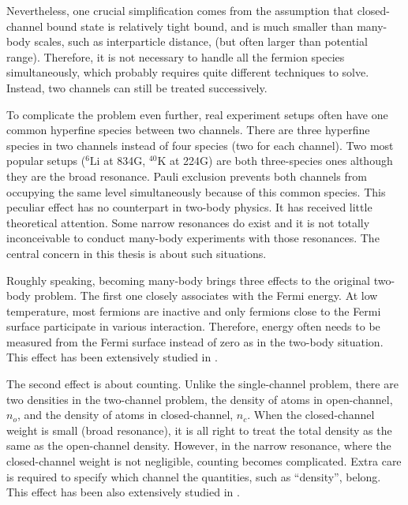   Nevertheless, one crucial simplification comes from  the assumption that closed-channel bound state is relatively tight bound, and is much smaller than  many-body scales, such as interparticle distance, (but often larger than potential range).  Therefore, it is not necessary to handle all the  fermion species simultaneously, which probably requires quite different techniques to solve. Instead, two channels can still be treated successively. 

To complicate the problem even further,  real experiment setups often have one common hyperfine species between two channels. There are three hyperfine species in two channels instead of four species (two for each channel).  Two most popular setups (${}^{6}\text{Li}$ at 834G, $^{40}\text{K}$ at 224G) are both three-species ones although they are the broad resonance.  Pauli exclusion prevents  both channels from occupying the same level simultaneously because of this common species.  This peculiar effect has no counterpart in two-body physics. It has  received little theoretical attention.    Some  narrow resonances do exist \cite{ChinRMP} and it is not totally inconceivable to conduct many-body experiments with those resonances.  The central concern in this thesis is about such situations. 

Roughly speaking, becoming many-body brings three effects to the original two-body problem.  The first one closely associates with the Fermi energy.  At low temperature, most fermions are inactive and only fermions close to the Fermi surface participate in various interaction. Therefore, energy often needs to be measured from the Fermi surface instead of zero as in the two-body situation.  This effect has been extensively studied in \cite{GurarieNarrow}.

The second effect is about counting. Unlike the single-channel problem, there are two densities in the two-channel problem, the density of atoms in open-channel, $n_{o}$, and the density of atoms in closed-channel, $n_{c}$. When the closed-channel weight is small (broad resonance), it is all right to treat the total density as the same as the open-channel density.  However, in the narrow resonance, where the closed-channel weight is not negligible, counting becomes complicated.  Extra care is required to specify which channel the  quantities, such as ``density'', belong.  This effect has been  also extensively studied in \cite{GurarieNarrow}.

